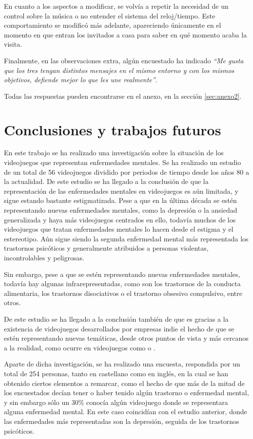 \documentclass[12pt, a4paper,twoside,titlepage]{book}
\begin{document}
En cuanto a los aspectos a modificar, se volvía a repetir la necesidad de un control sobre la música o no entender el sistema del reloj/tiempo. Este comportamiento se modificó más adelante, apareciendo únicamente en el momento en que entran los invitados a casa para saber en qué momento acaba la visita. 

Finalmente, en las observaciones extra, algún encuestado ha indicado \textit{``Me gusta que los tres tengan distintos mensajes en el mismo entorno y con los mismos objetivos, defiende mejor lo que les une realmente''}. 

Todas las respuestas pueden encontrarse en el anexo, en la sección \ref{sec:anexo2}. 

\chapter{Conclusiones y trabajos futuros}

En este trabajo se ha realizado una investigación sobre la situación de los videojuegos que representan enfermedades mentales. Se ha realizado un estudio de un total de 56 videojuegos dividido por periodos de tiempo desde los años 80 a la actualidad. De este estudio se ha llegado a la conclusión de que la representación de las enfermedades mentales en videojuegos es aún limitada, y sigue estando bastante estigmatizada. Pese a que en la última década se estén representando nuevas enfermedades mentales, como la depresión o la ansiedad generalizada y haya más videojuegos centrados en ello, todavía muchos de los videojuegos que tratan enfermedades mentales lo hacen desde el estigma y el estereotipo. Aún sigue siendo la segunda enfermedad mental más representada los trastornos psicóticos y generalmente atribuidos a personas violentas, incontrolables y peligrosas. 

Sin embargo, pese a que se estén representando nuevas enfermedades mentales, todavía hay algunas infrarepresentadas, como son los trastornos de la conducta alimentaria, los trastornos disociativos o el trastorno obsesivo compulsivo, entre otros. 

De este estudio se ha llegado a la conclusión también de que es gracias a la existencia de videojuegos desarrollados por empresas indie el hecho de que se estén representando nuevas temáticas, desde otros puntos de vista y más cercanos a la realidad, como ocurre en videojuegos como  o . 

Aparte de dicha investigación, se ha realizado una encuesta, respondida por un total de 254 personas, tanto en castellano como en inglés, en la cual se han obtenido ciertos elementos a remarcar, como el hecho de que más de la mitad de los encuestados decían tener o haber tenido algún trastorno o enfermedad mental, y sin embargo sólo un 30\% conocía algún videojuego donde se representara alguna enfermedad mental. En este caso coincidían con el estudio anterior, donde las enfermedades más representadas son la depresión, seguida de los trastornos psicóticos.
\end{document}
